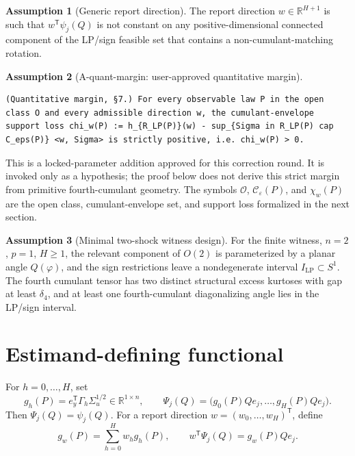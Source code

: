 \documentclass[11pt]{article}
\newcommand{\transpose}{\mathsf{T}}
\newcommand{\R}{\mathbb{R}}
\theoremstyle{definition}
\newtheorem{assumption}{Assumption}
\theoremstyle{plain}
\theoremstyle{remark}
\begin{document}
\begin{assumption}[Generic report direction]\label{ass:generic-report}
The report direction \(w\in\R^{H+1}\) is such that
\(w^\transpose\psi_j(Q)\) is not constant on any positive-dimensional
connected component of the LP/sign feasible set that contains a
non-cumulant-matching rotation.
\end{assumption}

\begin{assumption}[A-quant-margin: user-approved quantitative margin]\label{ass:A-quant-margin}\label{ass:quant-margin}
\begin{verbatim}
(Quantitative margin, §7.) For every observable law P in the open class O and every admissible direction w, the cumulant-envelope support loss chi_w(P) := h_{R_LP(P)}(w) - sup_{Sigma in R_LP(P) cap C_eps(P)} <w, Sigma> is strictly positive, i.e. chi_w(P) > 0.
\end{verbatim}
This is a locked-parameter addition approved for this correction round.  It is
invoked only as a hypothesis; the proof below does not derive this strict
margin from primitive fourth-cumulant geometry.  The symbols
\(\mathcal O\), \(\mathcal C_\varepsilon(P)\), and \(\chi_w(P)\) are the
open class, cumulant-envelope set, and support loss formalized in the next
section.
\end{assumption}

\begin{assumption}[Minimal two-shock witness design]\label{ass:two-shock}
For the finite witness, \(n=2\), \(p=1\), \(H\ge1\), the relevant component of
\(O(2)\) is parameterized by a planar angle \(Q(\varphi)\), and the sign
restrictions leave a nondegenerate interval \(I_{\mathrm{LP}}\subset S^1\).
The fourth cumulant tensor has two distinct structural excess kurtoses with
gap at least \(\delta_4\), and at least one fourth-cumulant diagonalizing angle
lies in the LP/sign interval.
\end{assumption}

\section{Estimand-defining functional}
For \(h=0,\ldots,H\), set
\[
g_h(P)=e_y^\transpose\Gamma_h\Sigma_u^{1/2}\in\R^{1\times n},
\qquad
\Psi_j(Q)=\bigl(g_0(P)Qe_j,\ldots,g_H(P)Qe_j\bigr).
\]
Then \(\Psi_j(Q)=\psi_j(Q)\).  For a report direction
\(w=(w_0,\ldots,w_H)^\transpose\), define
\[
g_w(P)=\sum_{h=0}^H w_h g_h(P),\qquad
w^\transpose\Psi_j(Q)=g_w(P)Qe_j.
\]
\end{document}
